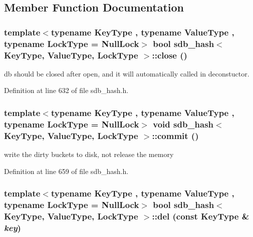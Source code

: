 \subsection{Member Function Documentation}
\hypertarget{classsdb__hash_2ebf3f46da2bfa6249badf1d1af352f2}{
\subsubsection[{close}]{\setlength{\rightskip}{0pt plus 5cm}template$<$typename KeyType , typename ValueType , typename LockType  = NullLock$>$ bool {\bf sdb\_\-hash}$<$ KeyType, ValueType, LockType $>$::close ()}}
\label{classsdb__hash_2ebf3f46da2bfa6249badf1d1af352f2}


db should be closed after open, and it will automatically called in deconstuctor. 

Definition at line 632 of file sdb\_\-hash.h.\hypertarget{classsdb__hash_23b1c9a395291fbe24416d2e1c24d364}{
\subsubsection[{commit}]{\setlength{\rightskip}{0pt plus 5cm}template$<$typename KeyType , typename ValueType , typename LockType  = NullLock$>$ void {\bf sdb\_\-hash}$<$ KeyType, ValueType, LockType $>$::commit ()}}
\label{classsdb__hash_23b1c9a395291fbe24416d2e1c24d364}


write the dirty buckets to disk, not release the memory 

Definition at line 659 of file sdb\_\-hash.h.\hypertarget{classsdb__hash_a6ada730f03769b29c7c2e71d97fcd14}{
\subsubsection[{del}]{\setlength{\rightskip}{0pt plus 5cm}template$<$typename KeyType , typename ValueType , typename LockType  = NullLock$>$ bool {\bf sdb\_\-hash}$<$ KeyType, ValueType, LockType $>$::del (const KeyType \& {\em key})}}
\label{classsdb__hash_a6ada730f03769b29c7c2e71d97fcd14}


